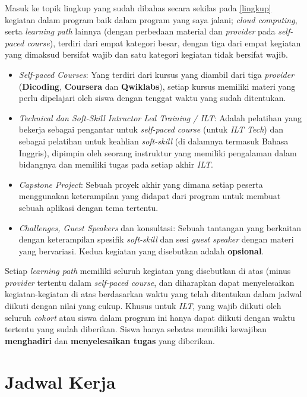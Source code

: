 Masuk ke topik lingkup yang sudah dibahas secara sekilas pada \ref{lingkup} kegiatan dalam program baik dalam program yang saya jalani; \textit{cloud computing}, serta \textit{learning path} lainnya (dengan perbedaan material dan \textit{provider} pada \textit{self-paced course}), terdiri dari empat kategori besar, dengan tiga dari empat kegiatan yang dimaksud bersifat wajib dan satu kategori kegiatan tidak bersifat wajib.
\begin{itemize}
    \item \textit{Self-paced Courses}: Yang terdiri dari kursus yang diambil dari tiga \textit{provider} (\textbf{Dicoding}, \textbf{Coursera} dan \textbf{Qwiklabs}), setiap kursus memiliki materi yang perlu dipelajari oleh siswa dengan tenggat waktu yang sudah ditentukan.
    \item \textit{Technical dan Soft-Skill Intructor Led Training / ILT}: Adalah pelatihan yang bekerja sebagai pengantar untuk \textit{self-paced course} (untuk \textit{ILT Tech}) dan sebagai pelatihan untuk keahlian \textit{soft-skill} (di dalamnya termasuk Bahasa Inggris), dipimpin oleh seorang instruktur yang memiliki pengalaman dalam bidangnya dan memiliki tugas pada setiap akhir \textit{ILT}.
    \item \textit{Capstone Project}: Sebuah proyek akhir yang dimana setiap peserta menggunakan keterampilan yang didapat dari program untuk membuat sebuah aplikasi dengan tema tertentu.
    \item \textit{Challenges, Guest Speakers} dan konsultasi: Sebuah tantangan yang berkaitan dengan keterampilan spesifik \textit{soft-skill} dan sesi \textit{guest speaker} dengan materi yang bervariasi. Kedua kegiatan yang disebutkan adalah \textbf{opsional}.
\end{itemize}
Setiap \textit{learning path} memiliki seluruh kegiatan yang disebutkan di atas (minus \textit{provider} tertentu dalam \textit{self-paced course}, dan diharapkan dapat menyelesaikan kegiatan-kegiatan di atas berdasarkan waktu yang telah ditentukan dalam jadwal diikuti dengan nilai yang cukup. Khusus untuk \textit{ILT}, yang wajib diikuti oleh seluruh \textit{cohort} atau siswa dalam program ini hanya dapat diikuti dengan waktu tertentu yang sudah diberikan. Siswa hanya sebatas memiliki kewajiban \textbf{menghadiri} dan \textbf{menyelesaikan tugas} yang diberikan.

\section{Jadwal Kerja}

